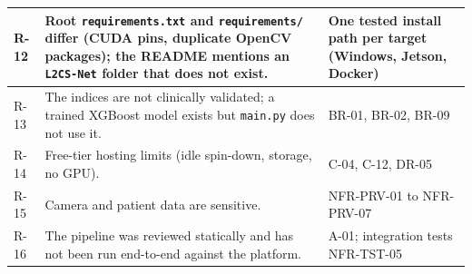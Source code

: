 \documentclass[a4paper,11pt]{scrreprt}
\newcommand{\code}[1]{\texttt{#1}}
\begin{document}
\begin{longtable}{@{}>{\ttfamily\footnotesize}p{1.1cm}>{\raggedright\arraybackslash}p{7.3cm}>{\raggedright\arraybackslash}p{6.2cm}@{}}
R-12 & Root \code{requirements.txt} and \code{requirements/} differ (CUDA pins, duplicate OpenCV packages); the README mentions an \code{L2CS-Net} folder that does not exist. & One tested install path per target (Windows, Jetson, Docker)\\ \midrule
R-13 & The indices are not clinically validated; a trained XGBoost model exists but \code{main.py} does not use it. & BR-01, BR-02, BR-09\\ \midrule
R-14 & Free-tier hosting limits (idle spin-down, storage, no GPU). & C-04, C-12, DR-05\\ \midrule
R-15 & Camera and patient data are sensitive. & NFR-PRV-01 to NFR-PRV-07\\ \midrule
R-16 & The pipeline was reviewed statically and has not been run end-to-end against the platform. & A-01; integration tests NFR-TST-05\\
\end{longtable}

\appendix
\end{document}
